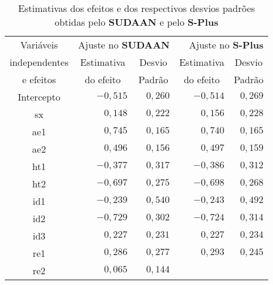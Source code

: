 \documentclass[]{book}
\begin{document}
\begin{center}
\begin{table}[tbp] \centering%
\caption{Estimativas dos efeitos e dos respectivos desvios padrões obtidas
pelo {\bf SUDAAN} e pelo {\bf S-Plus} }\bigskip \label{tab62} 
\begin{tabular}{|c|cc|cc|}
\hline\hline
Variáveis & \multicolumn{2}{|r}{Ajuste no \textbf{SUDAAN}} & 
\multicolumn{2}{|r|}{Ajuste no \textbf{S-Plus}} \\ \cline{2-5}
independentes & Estimativa & Desvio & Estimativa & Desvio \\ 
e efeitos & do efeito & Padrão & do efeito & Padrão \\ \hline\hline
Intercepto & \multicolumn{1}{|r}{$-0,515$} & \multicolumn{1}{r|}{$0,260$} & 
\multicolumn{1}{|r}{$-0,514$} & \multicolumn{1}{r|}{$0,269$} \\ 
sx & \multicolumn{1}{|r}{$0,148$} & \multicolumn{1}{r|}{$0,222$} & 
\multicolumn{1}{|r}{$0,156$} & \multicolumn{1}{r|}{$0,228$} \\ 
ae1 & \multicolumn{1}{|r}{$0,745$} & \multicolumn{1}{r|}{$0,165$} & 
\multicolumn{1}{|r}{$0,740$} & \multicolumn{1}{r|}{$0,165$} \\ 
ae2 & \multicolumn{1}{|r}{$0,496$} & \multicolumn{1}{r|}{$0,156$} & 
\multicolumn{1}{|r}{$0,497$} & \multicolumn{1}{r|}{$0,159$} \\ 
ht1 & \multicolumn{1}{|r}{$-0,377$} & \multicolumn{1}{r|}{$0,317$} & 
\multicolumn{1}{|r}{$-0,386$} & \multicolumn{1}{r|}{$0,312$} \\ 
ht2 & \multicolumn{1}{|r}{$-0,697$} & \multicolumn{1}{r|}{$0,275$} & 
\multicolumn{1}{|r}{$-0,698$} & \multicolumn{1}{r|}{$0,268$} \\ 
id1 & \multicolumn{1}{|r}{$-0,239$} & \multicolumn{1}{r|}{$0,540$} & 
\multicolumn{1}{|r}{$-0,243$} & \multicolumn{1}{r|}{$0,492$} \\ 
id2 & \multicolumn{1}{|r}{$-0,729$} & \multicolumn{1}{r|}{$0,302$} & 
\multicolumn{1}{|r}{$-0,724$} & \multicolumn{1}{r|}{$0,314$} \\ 
id3 & \multicolumn{1}{|r}{$0,227$} & \multicolumn{1}{r|}{$0,231$} & 
\multicolumn{1}{|r}{$0,227$} & \multicolumn{1}{r|}{$0,234$} \\ 
re1 & \multicolumn{1}{|r}{$0,286$} & \multicolumn{1}{r|}{$0,277$} & 
\multicolumn{1}{|r}{$0,293$} & \multicolumn{1}{r|}{$0,245$} \\ 
re2 & \multicolumn{1}{|r}{$0,065$} & \multicolumn{1}{r|}{$0,144$} & 

\end{tabular}
\end{table}
\end{center}
\end{document}
